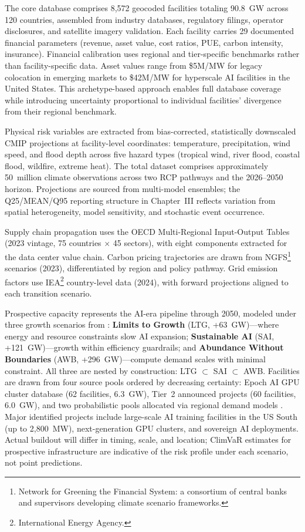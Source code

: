 \begin{twocolbody}

\noindent The core database comprises 8,572 geocoded facilities totaling 90.8~GW across 120 countries, assembled from industry databases, regulatory filings, operator disclosures, and satellite imagery validation. Each facility carries 29 documented financial parameters (revenue, asset value, cost ratios, PUE, carbon intensity, insurance). Financial calibration uses regional and tier-specific benchmarks rather than facility-specific data. Asset values range from \$5M/MW for legacy colocation in emerging markets to \$42M/MW for hyperscale AI facilities in the United States. This archetype-based approach enables full database coverage while introducing uncertainty proportional to individual facilities' divergence from their regional benchmark.

Physical risk variables are extracted from bias-corrected, statistically downscaled CMIP projections at facility-level coordinates: temperature, precipitation, wind speed, and flood depth across five hazard types (tropical wind, river flood, coastal flood, wildfire, extreme heat). The total dataset comprises approximately 50~million climate observations across two RCP pathways and the 2026--2050 horizon. Projections are sourced from multi-model ensembles; the Q25/MEAN/Q95 reporting structure in Chapter~III reflects variation from spatial heterogeneity, model sensitivity, and stochastic event occurrence.

Supply chain propagation uses the OECD Multi-Regional Input-Output Tables (2023 vintage, 75 countries $\times$ 45 sectors), with eight components extracted for the data center value chain. Carbon pricing trajectories are drawn from NGFS\footnote{Network for Greening the Financial System: a consortium of central banks and supervisors developing climate scenario frameworks.} scenarios (2023), differentiated by region and policy pathway. Grid emission factors use IEA\footnote{International Energy Agency.} country-level data (2024), with forward projections aligned to each transition scenario.

Prospective capacity represents the AI-era pipeline through 2050, modeled under three growth scenarios from \citet{paccou2024}: \textbf{Limits to Growth} (LTG, +63~GW)---where energy and resource constraints slow AI expansion; \textbf{Sustainable AI} (SAI, +121~GW)---growth within efficiency guardrails; and \textbf{Abundance Without Boundaries} (AWB, +296~GW)---compute demand scales with minimal constraint. All three are nested by construction: LTG $\subset$ SAI $\subset$ AWB. Facilities are drawn from four source pools ordered by decreasing certainty: Epoch AI GPU cluster database (62 facilities, 6.3~GW), Tier~2 announced projects (60 facilities, 6.0~GW), and two probabilistic pools allocated via regional demand models \citep{iea2025energyai, paccou2024}. Major identified projects include large-scale AI training facilities in the US South (up to 2,800~MW), next-generation GPU clusters, and sovereign AI deployments. Actual buildout will differ in timing, scale, and location; ClimVaR estimates for prospective infrastructure are indicative of the risk profile under each scenario, not point predictions.


\end{twocolbody}
